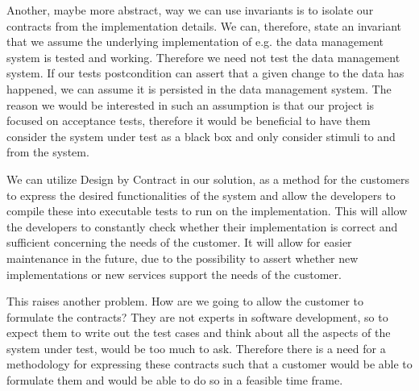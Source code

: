 Another, maybe more abstract, way we can use invariants is to isolate our contracts from the implementation details.
We can, therefore, state an invariant that we assume the underlying implementation of e.g. the data management system is tested and working.
Therefore we need not test the data management system.
If our tests postcondition can assert that a given change to the data has happened, we can assume it is persisted in the data management system.
The reason we would be interested in such an assumption is that our project is focused on acceptance tests, therefore it would be beneficial to have them consider the system under test as a black box and only consider stimuli to and from the system.

We can utilize Design by Contract in our solution, as a method for the customers to express the desired functionalities of the system and allow the developers to compile these into executable tests to run on the implementation. 
This will allow the developers to constantly check whether their implementation is correct and sufficient concerning the needs of the customer. 
It will allow for easier maintenance in the future, due to the possibility to assert whether new implementations or new services support the needs of the customer.

This raises another problem. 
How are we going to allow the customer to formulate the contracts? 
They are not experts in software development, so to expect them to write out the test cases and think about all the aspects of the system under test, would be too much to ask.
Therefore there is a need for a methodology for expressing these contracts such that a customer would be able to formulate them and would be able to do so in a feasible time frame.
